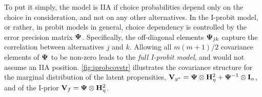 To put it simply, the model is IIA if choice probabilities depend only on the choice in consideration, and not on any other alternatives.
In the I-probit model, or rather, in probit models in general, choice dependency is controlled by the error precision matrix ${\bm\Psi}$.
Specifically, the off-diagonal elements ${\bm\Psi}_{jk}$ capture the correlation between alternatives $j$ and $k$.
Allowing all $m(m+1)/2$ covariance elements of ${\bm\Psi}$ to be non-zero leads to the \emph{full I-probit model}, and would not assume an IIA position.
\cref{fig:iprobcovstr} illustrates the covariance structure for the marginal distribution of the latent propensities, ${\mathbf V}_{y^*} = {\bm\Psi} \otimes {\mathbf H}_\eta^2 + {\bm\Psi}^{-1} \otimes {\mathbf I}_n$, and of the I-prior ${\mathbf V}_f = {\bm\Psi} \otimes {\mathbf H}_\eta^2$.

\begin{figure}[hbt]
\centering\hspace{-13pt}
\begin{blockmatrixtabular}
\end{blockmatrixtabular}
\end{figure}
